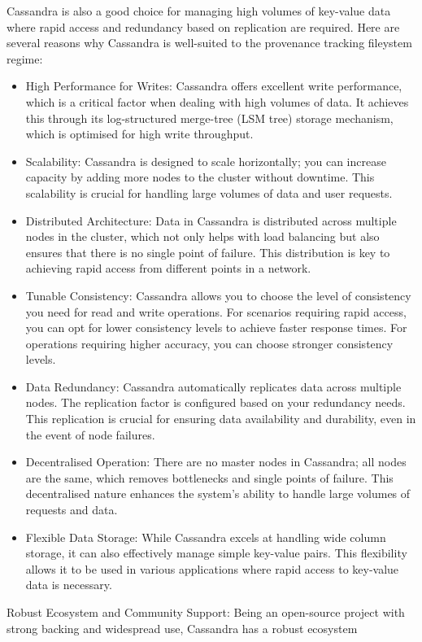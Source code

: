 \documentclass{tufte-handout}
\begin{document}
Cassandra is also a good choice for managing high volumes of key-value data where rapid access and redundancy based on replication are
required. Here are several reasons why Cassandra is well-suited to the provenance tracking fileystem regime:
\begin{itemize}
  \item High Performance for Writes: Cassandra offers excellent write performance, which is a critical factor when dealing with high
  volumes of data. It achieves this through its log-structured merge-tree (LSM tree) storage mechanism, which is optimised for high write
  throughput.
  \item Scalability: Cassandra is designed to scale horizontally; you can increase capacity by adding more nodes to the cluster without
  downtime. This scalability is crucial for handling large volumes of data and user requests.
  \item Distributed Architecture: Data in Cassandra is distributed across multiple nodes in the cluster, which not only helps with load
  balancing but also ensures that there is no single point of failure. This distribution is key to achieving rapid access from different
  points in a network.
  \item Tunable Consistency: Cassandra allows you to choose the level of consistency you need for read and write operations. For scenarios
  requiring rapid access, you can opt for lower consistency levels to achieve faster response times. For operations requiring higher accuracy,
  you can choose stronger consistency levels.
  \item Data Redundancy: Cassandra automatically replicates data across multiple nodes. The replication factor is configured based on
  your redundancy needs. This replication is crucial for ensuring data availability and durability, even in the event of node failures.
  \item Decentralised Operation: There are no master nodes in Cassandra; all nodes are the same, which removes bottlenecks and single points
  of failure. This decentralised nature enhances the system's ability to handle large volumes of requests and data.
  \item Flexible Data Storage: While Cassandra excels at handling wide column storage, it can also effectively manage simple key-value
  pairs. This flexibility allows it to be used in various applications where rapid access to key-value data is necessary.
\end{itemize}
Robust Ecosystem and Community Support: Being an open-source project with strong backing and widespread use, Cassandra has a robust ecosystem
\end{document}
